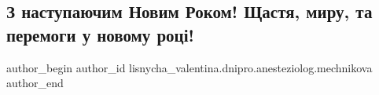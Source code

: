  
 
 
 
 

\subsection{З наступаючим Новим Роком! Щастя, миру, та перемоги у новому році!}
\label{sec:30_12_2022.fb.lisnycha_valentina.dnipro.anesteziolog.mechnikova.1.z_nastupayuchim_novi}

\ifcmt
 author_begin
   author_id lisnycha_valentina.dnipro.anesteziolog.mechnikova
 author_end
\fi
